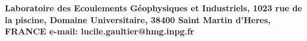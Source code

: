 \documentclass[portrait,a0b,final,a4resizeable]{a0poster}
\newenvironment{poster}{
  \begin{center}
  \begin{minipage}[c]{1.0\textwidth}
}{
  \end{minipage} 
  \end{center}
}
\begin{document}
\begin{poster}
 
{\small
   
% 
  
}
  
\begin{center}
  {\bf Laboratoire des Ecoulements G\'eophysiques et Industriels, 
1023 rue de la piscine, Domaine Universitaire, 38400 Saint Martin d'Heres, FRANCE 
e-mail: lucile.gaultier@hmg.inpg.fr}
\end{center}
 
\end{poster}
\end{document}
